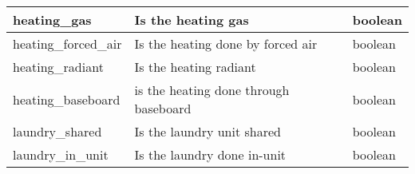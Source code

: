 \documentclass[12pt]{report}
\begin{document}
\begin{longtable}{|p{4cm}|p{8.7cm}|p{2.5cm}|}
	heating\_gas                       & Is the heating gas                                                  & boolean          \\ \hline
	heating\_forced\_air               & Is the heating done by forced air                                   & boolean          \\ \hline
	heating\_radiant                   & Is the heating radiant                                              & boolean          \\ \hline
	heating\_baseboard                 & is the heating done through baseboard                               & boolean          \\ \hline
	laundry\_shared                    & Is the laundry unit shared                                          & boolean          \\ \hline
	laundry\_in\_unit                  & Is the laundry done in-unit                                         & boolean          \\ \hline
\end{longtable}
\end{document}
